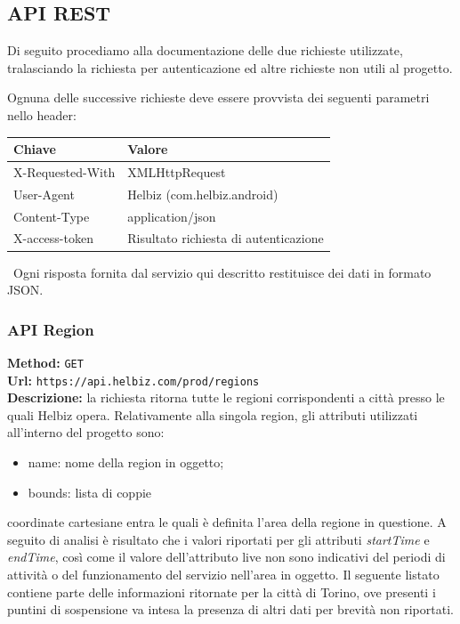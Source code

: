 \subsection{API REST}

Di seguito procediamo alla documentazione delle due richieste utilizzate,
tralasciando la richiesta per autenticazione ed altre richieste non
utili al progetto.

Ognuna delle successive richieste deve essere provvista dei seguenti
parametri nello header: \\

\begin{table}[h]
\centering
\begin{tabular}{|l|l|}
\hline
\rowcolor[HTML]{3166FF} 
{\color[HTML]{FFFFFF} \textbf{Chiave}} & {\color[HTML]{FFFFFF} \textbf{Valore}} \\ \hline
X-Requested-With                       & XMLHttpRequest                         \\ \hline
User-Agent                             & Helbiz (com.helbiz.android)            \\ \hline
Content-Type                           & application/json                       \\ \hline
X-access-token                         & Risultato richiesta di autenticazione  \\ \hline
\end{tabular}
\end{table}

\noindent~Ogni risposta fornita dal servizio qui descritto restituisce dei
dati in formato JSON.

\subsubsection{API Region}

\textbf{Method:} \texttt{GET} \\
\textbf{Url:} \texttt{https://api.helbiz.com/prod/regions} \\

\noindent\textbf{Descrizione:} la richiesta ritorna tutte le regioni corrispondenti
a città presso le quali Helbiz opera.
Relativamente alla singola region, gli attributi utilizzati all'interno del
progetto sono:
\begin{itemize}
\item name: nome della region in oggetto;
\item bounds: lista di coppie
\end{itemize}
coordinate cartesiane entra le quali è definita l'area della regione in
questione.
A seguito di analisi è risultato che i valori riportati per gli attributi
\emph{startTime} e \emph{endTime}, così come il valore dell'attributo live non sono
indicativi del periodi di attività o del funzionamento del servizio
nell'area in oggetto.
Il seguente listato contiene parte delle informazioni ritornate per
la città di Torino, ove presenti i puntini di sospensione va intesa
la presenza di altri dati per brevità non riportati.


